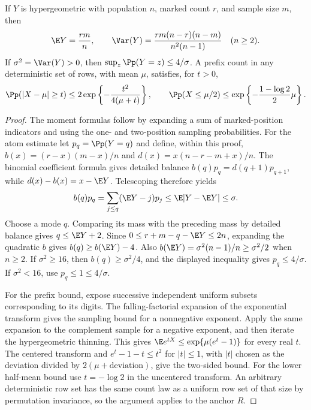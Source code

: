 \begin{lemma}\label{lem:upper-atoms}
If $Y$ is hypergeometric with population $n$, marked count $r$, and
sample size $m$, then
\[
 \E Y=\frac{rm}{n},\qquad
 \Var(Y)=\frac{rm(n-r)(n-m)}{n^2(n-1)}\quad(n\ge2).
\]
If $\sigma^2=\Var(Y)>0$, then $\sup_z\Pp(Y=z)\le4/\sigma$.
A prefix count in any deterministic set of rows, with mean $\mu$,
satisfies, for $t>0$,
\[
 \Pp(|X-\mu|\ge t)\le2\exp\left\{-\frac{t^2}{4(\mu+t)}\right\},
 \qquad
\Pp(X\le\mu/2)\le\exp\left\{-\frac{1-\log2}{2}\mu\right\}.
\]
\end{lemma}
\begin{proof}
The moment formulas follow by expanding a sum of marked-position
indicators and using the one- and two-position sampling probabilities.
For the atom estimate let $p_q=\Pp(Y=q)$ and define, within this proof,
$b(x)=(r-x)(m-x)/n$ and
$d(x)=x(n-r-m+x)/n$. The binomial coefficient formula gives detailed
balance $b(q)p_q=d(q+1)p_{q+1}$, while
$d(x)-b(x)=x-\E Y$. Telescoping therefore yields
\[
 b(q)p_q=\sum_{j\le q}(\E Y-j)p_j
       \le\E|Y-\E Y|\le\sigma.
\]
Choose a mode $q$. Comparing its mass with the preceding mass by
detailed balance gives $q\le\E Y+2$. Since
$0\le r+m-q-\E Y\le2n$, expanding the quadratic $b$ gives
$b(q)\ge b(\E Y)-4$. Also
$b(\E Y)=\sigma^2(n-1)/n\ge\sigma^2/2$ when $n\ge2$.
If $\sigma^2\ge16$, then $b(q)\ge\sigma^2/4$, and the displayed
inequality gives $p_q\le4/\sigma$. If $\sigma^2<16$, use
$p_q\le1\le4/\sigma$.

For the prefix bound, expose successive independent uniform subsets
corresponding to its digits. The falling-factorial expansion of the
exponential transform gives the sampling bound for a nonnegative
exponent. Apply the same expansion to the complement sample for a
negative exponent, and then iterate the hypergeometric thinning.
This gives $\E e^{tX}\le\exp\{\mu(e^t-1)\}$ for every real $t$.
The centered transform and $e^t-1-t\le t^2$ for $|t|\le1$,
with $|t|$ chosen as the deviation divided by $2(\mu+\text{deviation})$,
give the two-sided bound. For the lower half-mean bound use
$t=-\log2$ in the uncentered transform. An arbitrary deterministic
row set has the same count law as a uniform row set of that size by
permutation invariance, so the argument applies to the anchor $R$.
\end{proof}


